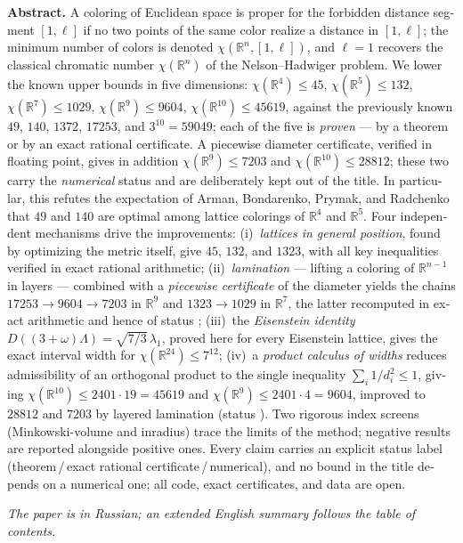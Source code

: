 \documentclass[11pt]{article}
\theoremstyle{definition}
\theoremstyle{remark}
\newcommand{\R}{\mathbb{R}}
\newcommand{\cyrbadge}[1]{{\fontencoding{T2A}\selectfont #1}}
\newcommand{\stC}{\textcolor{RoyalBlue}{\textbf{\cyrbadge{[С]}}}}       %
\newcommand{\stN}{\textcolor{BurntOrange}{\textbf{\cyrbadge{[Ч]}}}}     %
\begin{document}
\begin{otherlanguage}{english}
\noindent\textbf{Abstract.}
A coloring of Euclidean space is proper for the forbidden distance segment
$[1,\ell]$ if no two points of the same color realize a distance in
$[1,\ell]$; the minimum number of colors is denoted
$\chi(\R^n,[1,\ell])$, and $\ell=1$ recovers the classical chromatic number
$\chi(\R^n)$ of the Nelson--Hadwiger problem. We lower the known upper bounds
in five dimensions: $\chi(\R^4)\le45$, $\chi(\R^5)\le132$,
$\chi(\R^7)\le1029$, $\chi(\R^9)\le9604$, $\chi(\R^{10})\le45619$, against
the previously known $49$, $140$, $1372$, $17253$, and $3^{10}=59049$; each of
the five is \emph{proven} --- by a theorem or by an exact rational certificate.
A piecewise diameter certificate, verified in floating point, gives in addition
$\chi(\R^9)\le7203$ and $\chi(\R^{10})\le28812$; these two carry the
\emph{numerical} status \stN{} and are deliberately kept out of the title. In
particular, this refutes the expectation of Arman, Bondarenko, Prymak, and
Radchenko that $49$ and $140$ are optimal among lattice colorings of $\R^4$
and $\R^5$. Four independent mechanisms drive the improvements:
(i)~\emph{lattices in general position}, found by optimizing the metric
itself, give $45$, $132$, and $1323$, with all key inequalities verified in
exact rational arithmetic; (ii)~\emph{lamination} --- lifting a coloring of
$\R^{n-1}$ in layers --- combined with a \emph{piecewise certificate} of the
diameter yields the chains $17253\to9604\to7203$ in $\R^9$ and
$1323\to1029$ in $\R^7$, the latter recomputed in exact arithmetic and hence
of status \stC; (iii)~the \emph{Eisenstein identity}
$D((3+\omega)\Lambda)=\sqrt{7/3}\,\lambda_1$, proved here for every Eisenstein
lattice, gives the exact interval width for $\chi(\R^{24})\le7^{12}$; (iv)~a \emph{product calculus of widths}
reduces admissibility of an orthogonal product to the single inequality
$\sum_i 1/d_i^2\le1$, giving $\chi(\R^{10})\le2401\cdot19=45619$ and
$\chi(\R^9)\le2401\cdot4=9604$, improved to $28812$ and $7203$ by layered
lamination (status \stN). Two rigorous index screens
(Minkowski-volume and inradius) trace the limits of the method; negative
results are reported alongside positive ones. Every claim carries an
explicit status label (theorem\,/\,exact rational certificate\,/\,numerical),
and no bound in the title depends on a numerical one;
all code, exact certificates, and data are open.

\smallskip
\noindent\emph{The paper is in Russian; an extended English summary follows
the table of contents.}
\end{otherlanguage}
\end{document}
